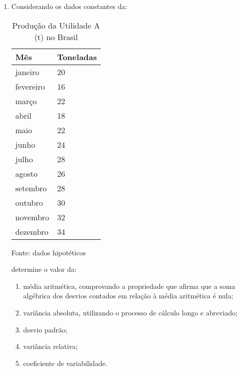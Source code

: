 \begin{enumerate}
\item Considerando os dados constantes da:
	\begin{table}[!htb]
	\centering
	\caption{Produção da Utilidade A (t) no Brasil}
	\vspace{0.5cm}
	\begin{tabular}{ll}
	Mês & Toneladas \\
	\hline 
	janeiro & 20 \\
	fevereiro & 16 \\
	março & 22 \\
	abril & 18 \\
	maio & 22 \\
	junho & 24 \\
	julho & 28	 \\
	agosto & 26 \\
	setembro & 28 \\
	outubro & 30 \\
	novembro & 32 \\
	dezembro & 34 \\
	\end{tabular}
	 \newline \newline Fonte: dados hipotéticos
	\end{table}
	 determine o valor da: 
	\begin{enumerate}
		\item média aritmética, comprovando a propriedade que afirma que a soma algébrica dos desvios contados em relação à média aritmética é nula;
		\item variância absoluta, utilizando o processo de cálculo longo e abreviado;
		\item desvio padrão;
		\item variância relativa;
		\item coeficiente de variabilidade.
	\end{enumerate}
	

\end{enumerate}
